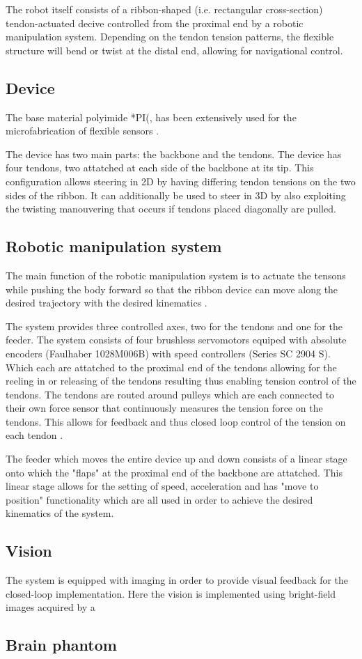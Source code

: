 The robot itself consists of a ribbon-shaped (i.e. rectangular cross-section) tendon-actuated decive controlled from the proximal end by a robotic manipulation system. Depending on the tendon tension patterns, the flexible structure will bend or twist at the distal end, allowing for navigational control. \cite{noseda_flat_2024}


\subsection{Device}
The base material polyimide *PI(, has been extensively used for the microfabrication of flexible sensors \cite{noseda_flat_2024}.

The device has two main parts: the backbone and the tendons. The device has four tendons, two attatched at each side of the backbone at its tip. This configuration allows steering in 2D by having differing tendon tensions on the two sides of the ribbon. It can additionally be used to steer in 3D by also exploiting the twisting manouvering that occurs if tendons placed diagonally are pulled.


\subsection{Robotic manipulation system}
The main function of the robotic manipulation system is to actuate the tensons while pushing the body forward so that the ribbon device can move along the desired trajectory with the desired kinematics \cite{noseda_flat_2024}. 

The system provides three controlled axes, two for the tendons and one for the feeder. The system consists of four brushless servomotors equiped with absolute encoders (Faulhaber 1028M006B) with speed controllers (Series SC 2904 S). Which each are attatched to the proximal end of the tendons allowing for the reeling in or releasing of the tendons resulting thus enabling tension control of the tendons. The tendons are routed around pulleys which are each connected to their own force sensor  that continuously measures the tension force on the tendons. This allows for feedback and thus closed loop control of the tension on each tendon . 

The feeder which moves the entire device up and down consists of a linear stage  onto which the "flaps" at the proximal end of the backbone are attatched. This linear stage allows for the setting of speed, acceleration and has "move to position" functionality which are all used in order to achieve the desired kinematics of the system.


\subsection{Vision}
The system is equipped with imaging in order to provide visual feedback for the closed-loop implementation. Here the vision is implemented using bright-field images acquired by a 

\subsection{Brain phantom}

